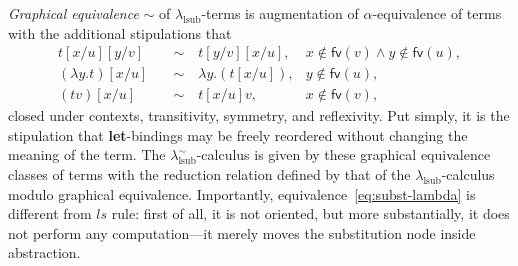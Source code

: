 \emph{Graphical equivalence} $\sim$ of $\lambda_{\text{lsub}}$-terms is augmentation of $\alpha$-equi\-va\-lence of terms with the additional stipulations that
\begin{align}
	t [x/u] [y/v] \quad        & \sim \quad t [y/v] [x/u],        & x \notin \textsf{fv} (v) \land y \notin \textsf{fv} (u),
  \tag{$1$}
  \label{eq:non_interacting_subst}\\
	(\lambda y. t) [x/u] \quad & \sim \quad \lambda y. (t [x/u]), & y \notin \textsf{fv} (u),                             
  \tag{$2$}
  \label{eq:subst-lambda}\\
	(t v) [x/u] \quad          & \sim \quad t [x/u] v,            & x \notin \textsf{fv} (v),
  \tag{$3$}
  \label{eq:subst-application}
\end{align}
closed under contexts, transitivity, symmetry, and reflexivity.
Put simply, it is the stipulation that \textbf{let}-bindings may be freely reordered without changing the meaning of the term.
The $\lambda^\sim_{\text{lsub}}$-calculus is given by these graphical equivalence classes of terms with the reduction relation defined by that of the $\lambda_{\text{lsub}}$-calculus modulo graphical equivalence.
Importantly, equivalence~\eqref{eq:subst-lambda} is different from $ls$ rule: first of all, it is not oriented, but more substantially, it does not perform any computation---it merely moves the substitution node inside abstraction.

